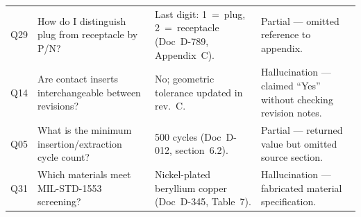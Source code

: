 \begin{table}[htbp]
\begin{tabularx}{\textwidth}{p{} p{} p{} p{}}
        \addlinespace
        
        Q29 &
        How do I distinguish plug from receptacle by P/N? &
        Last digit: 1~=~plug, 2~=~receptacle (Doc~D-789, Appendix~C). &
        Partial — omitted reference to appendix. \\
        
        \addlinespace
        
        Q14 &
        Are contact inserts interchangeable between revisions? &
        No; geometric tolerance updated in rev.~C. &
        Hallucination — claimed ``Yes'' without checking revision notes. \\
        
        \addlinespace
        
        Q05 &
        What is the minimum insertion/extraction cycle count? &
        500 cycles (Doc~D-012, section~6.2). &
        Partial — returned value but omitted source section. \\
        
        \addlinespace
        
        Q31 &
        Which materials meet MIL-STD-1553 screening? &
        Nickel-plated beryllium copper (Doc~D-345, Table~7). &
        Hallucination — fabricated material specification. \\
        
        \bottomrule
    \end{tabularx}
\end{table}
